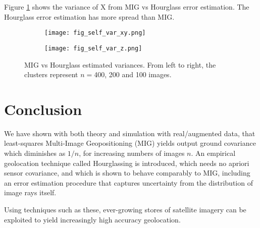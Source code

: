 \documentclass[10pt]{amsart}
\begin{document}
Figure \ref{fig:mig_vs_hourglass_var} shows the variance of X from MIG vs
Hourglass error estimation. The Hourglass error estimation has more spread than MIG.

\begin{figure}
\centering
\begin{subfigure}{.5\textwidth}
  \centering
  \texttt{[image: fig\_self\_var\_xy.png]}
\end{subfigure}%
\begin{subfigure}{.5\textwidth}
  \centering
  \texttt{[image: fig\_self\_var\_z.png]}
\end{subfigure}
\caption{\label{fig:mig_vs_hourglass_var}MIG vs Hourglass estimated
  variances. From left to right, the clusters represent $n=$400, 200 and 100
  images.}
\end{figure}

\section{Conclusion}
We have shown with both theory and simulation with real/augmented data, that
least-squares Multi-Image Geopositioning (MIG) yields output ground covariance
which diminishes as $1/n$, for increasing numbers of images $n$. An empirical
geolocation technique called Hourglassing is introduced, which needs no apriori
sensor covariance, and which is shown to behave comparably to MIG, including an
error estimation procedure that captures uncertainty from the distribution of
image rays itself.

Using techniques such as these, ever-growing stores of satellite imagery can be
exploited to yield increasingly high accuracy geolocation.
\end{document}
